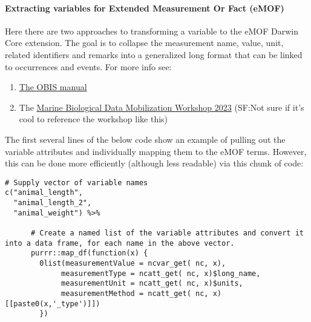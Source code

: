 \documentclass[
]{book}
\providecommand{\tightlist}{%
  \setlength{\itemsep}{0pt}\setlength{\parskip}{0pt}}
\begin{document}
\hypertarget{extracting-variables-for-extended-measurement-or-fact-emof}{%
\paragraph{Extracting variables for Extended Measurement Or Fact (eMOF)}\label{extracting-variables-for-extended-measurement-or-fact-emof}}

Here there are two approaches to transforming a variable to the eMOF Darwin Core extension. The goal is to collapse the measurement name, value, unit, related identifiers and remarks into a generalized long format that can be linked to occurrences and events. For more info see:

\begin{enumerate}
\def\labelenumi{\arabic{enumi}.}
\tightlist
\item
  \href{https://manual.obis.org/format_emof.html}{The OBIS manual}
\item
  The \href{https://ioos.github.io/bio_mobilization_workshop/04-create-schema/index.html}{Marine Biological Data Mobilization Workshop 2023} (SF:Not sure if it's cool to reference the workshop like this)
\end{enumerate}

The first several lines of the below code show an example of pulling out the variable attributes and individually mapping them to the eMOF terms. However, this can be done more efficiently (although less readable) via this chunk of code:

\begin{verbatim}
# Supply vector of variable names
c("animal_length",
  "animal_length_2",
  "animal_weight") %>%

      # Create a named list of the variable attributes and convert it into a data frame, for each name in the above vector.
      purrr::map_df(function(x) {
        0list(measurementValue = ncvar_get( nc, x),
             measurementType = ncatt_get( nc, x)$long_name,
             measurementUnit = ncatt_get( nc, x)$units,
             measurementMethod = ncatt_get( nc, x)[[paste0(x,'_type')]])
        })
\end{verbatim}
\end{document}
